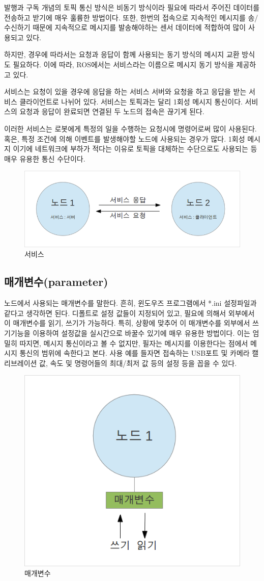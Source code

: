 발행과 구독 개념의 토픽 통신 방식은 비동기 방식이라 필요에 따라서 주어진 데이터를 전송하고 받기에 매우 훌륭한 방법이다. 또한, 한번의 접속으로 지속적인 메시지를 송/수신하기 때문에 지속적으로 메시지를 발송해야하는 센서 데이터에 적합하여 많이 사용되고 있다. 

하지만, 경우에 따라서는 요청과 응답이 함께 사용되는 동기 방식의 메시지 교환 방식도 필요하다. 이에 따라, ROS에서는 서비스라는 이름으로 메시지 동기 방식을 제공하고 있다. 

서비스는 요청이 있을 경우에 응답을 하는 서비스 서버와 요청을 하고 응답을 받는 서비스 클라이언트로 나뉘어 있다. 서비스는 토픽과는 달리 1회성 메시지 통신이다. 서비스의 요청과 응답이 완료되면 연결된 두 노드의 접속은 끊기게 된다. 

이러한 서비스는 로봇에게 특정의 일을 수행하는 요청시에 명령어로써 많이 사용된다. 혹은, 특정 조건에 의해 이벤트를 발생해야할 노드에 사용되는 경우가 많다. 1회성 메시지 이기에 네트워크에 부하가 적다는 이유로 토픽을 대체하는 수단으로도 사용되는 등 매우 유용한 통신 수단이다.

\begin{figure}[h]
\centering\includegraphics[width=0.5\columnwidth]{pictures/chapter7/msgtrans3.png}
\caption{서비스}
\end{figure}

\subsection{매개변수(parameter)}

노드에서 사용되는 매개변수를 말한다. 흔히, 윈도우즈 프로그램에서 *.ini 설정파일과 같다고 생각하면 된다. 디폴트로 설정 값들이 지정되어 있고, 필요에 의해서 외부에서 이 매개변수를 읽기, 쓰기가 가능하다. 특히, 상황에 맞추어 이 매개변수를 외부에서 쓰기기능을 이용하여 설정값을 실시간으로 바꿀수 있기에 매우 유용한 방법이다. 이는 엄밀히 따지면, 메시지 통신이라고 볼 수 없지만, 필자는 메시지를 이용한다는 점에서 메시지 통신의 범위에 속한다고 본다. 사용 예를 들자면 접속하는 USB포트 및 카메라 캘리브레이션 값, 속도 및 명령어들의 최대/최저 값 등의 설정 등을 꼽을 수 있다.

\begin{figure}[h]
\centering\includegraphics[width=0.5\columnwidth]{pictures/chapter7/msgtrans4.png}
\caption{매개변수}
\end{figure}

